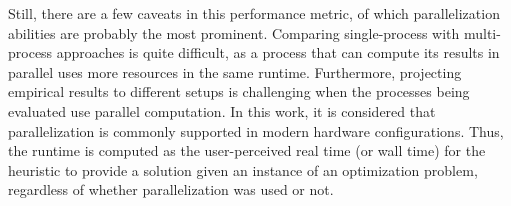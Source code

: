 Still, there are a few caveats in this performance metric, of which parallelization abilities are probably the most prominent.
Comparing single-process with multi-process approaches is quite difficult, as a process that can compute its results in parallel uses more resources in the same runtime. 
Furthermore, projecting empirical results to different setups is challenging when the processes being evaluated use parallel computation. 
In this work, it is considered that parallelization is commonly supported in modern hardware configurations.
Thus, the runtime is computed as the user-perceived real time (or wall time) for the heuristic to provide a solution given an instance of an optimization problem, regardless of whether parallelization was used or not.





